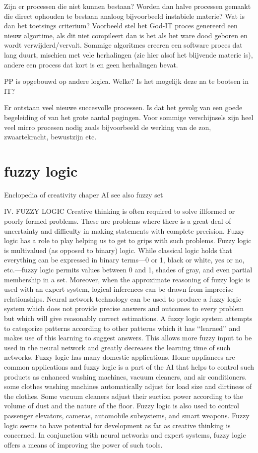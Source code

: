 \documentclass[a4paper]{Thesis}
\begin{document}
Zijn er processen die niet kunnen bestaan? Worden dan halve processen gemaakt die direct ophouden te bestaan analoog bijvoorbeeld instabiele materie?
Wat is dan het toetsings criterium? Voorbeeld stel het God-IT proces genereerd een nieuw algortime, als dit niet compileert dan is het als het ware dood geboren en wordt verwijderd/vervalt. Sommige algoritmes creeren een software proces dat lang duurt, mischien met vele herhalingen (zie hier alsof het blijvende materie is), andere een process dat kort is en geen herhalingen bevat.

PP is opgebouwd op andere logica. Welke? Is het mogelijk deze na te bootsen in IT?

Er ontstaan veel nieuwe succesvolle processen. Is dat het gevolg van een goede begeleiding of van het grote aantal pogingen. Voor sommige verschijnsels zijn heel veel micro procesen nodig zoals bijvoorbeeld de werking van de zon, zwaartekracht, bewustzijn etc.

\section{fuzzy logic}
Enclopedia of creativity chaper AI
see also fuzzy set

IV. FUZZY LOGIC
Creative thinking is often required to solve illformed
or poorly formed problems. These are problems
where there is a great deal of uncertainty and difficulty
in making statements with complete precision.
Fuzzy logic has a role to play helping us to get to grips
with such problems. Fuzzy logic is multivalued (as opposed
to binary) logic. While classical logic holds that
everything can be expressed in binary terms—0 or 1,
black or white, yes or no, etc.—fuzzy logic permits
values between 0 and 1, shades of gray, and even partial
membership in a set. Moreover, when the approximate
reasoning of fuzzy logic is used with an expert
system, logical inferences can be drawn from imprecise
relationships.
Neural network technology can be used to produce
a fuzzy logic system which does not provide precise
answers and outcomes to every problem but which will
give reasonably correct estimations. A fuzzy logic system
attempts to categorize patterns according to other
patterns which it has ‘‘learned’’ and makes use of this
learning to suggest answers. This allows more fuzzy input
to be used in the neural network and greatly decreases
the learning time of such networks.
Fuzzy logic has many domestic applications. Home
appliances are common applications and fuzzy logic is
a part of the AI that helps to control such products as
enhanced washing machines, vacuum cleaners, and
air conditioners. some clothes washing machines automatically
adjust for load size and dirtiness of the
clothes. Some vacuum cleaners adjust their suction
power according to the volume of dust and the nature
of the floor. Fuzzy logic is also used to control passenger
elevators, cameras, automobile subsystems, and
smart weapons. Fuzzy logic seems to have potential for
development as far as creative thinking is concerned.
In conjunction with neural networks and expert systems,
fuzzy logic offers a means of improving the
power of such tools.
\end{document}
